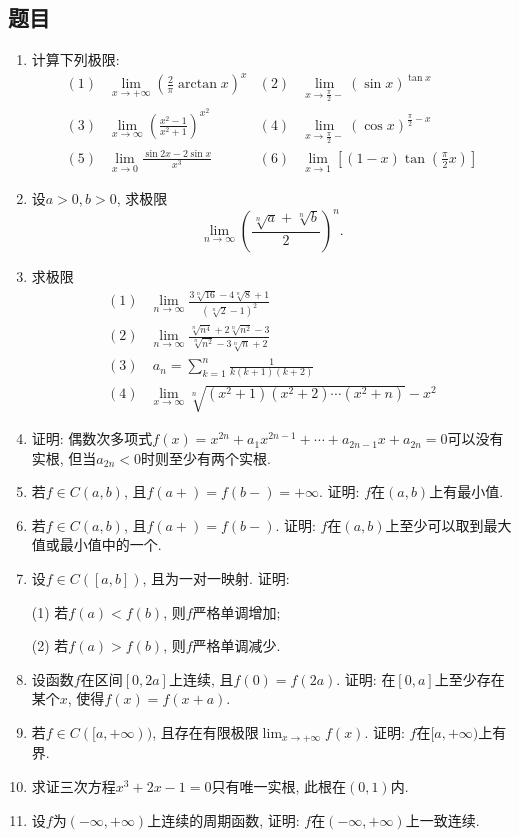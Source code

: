 \documentclass[UTF8,11pt, a4paper, oneside, fontset=none]{ctexbook}
\begin{document}
\subsection*{题目}
\begin{enumerate}

\item 计算下列极限:
\begin{align*}
(1) & \lim_{x \to +\infty} \left( \frac{2}{\pi} \arctan x\right)^x  & (2) & \lim_{x \to \frac{\pi}{2}-} (\sin x )^{\tan x}\\
(3) & \lim_{x \to \infty} \left( \frac{x^2 -1}{x^2 +1}\right)^{x^2} & (4) & \lim_{x \to \frac{\pi}{2}-} (\cos x)^{\frac{\pi}{2} - x} \\
(5) & \lim_{x \to 0} \frac{\sin 2x - 2 \sin x}{x^3} & (6) & \lim_{x \to 1} \left[(1-x)\tan\left(\frac{\pi}{2}x\right) \right]
\end{align*}

\item 设$a>0, b>0$, 求极限
\[
\lim_{n \to \infty} \left( \frac{\sqrt[n]{a} + \sqrt[n]{b}}{2} \right)^n.
\]

\item 求极限
\begin{align*}
(1) & \lim_{n \to \infty} \frac{3 \sqrt[n]{16} - 4 \sqrt[n]{8} +1}{(\sqrt[n]{2}-1)^2} \\
(2) & \lim_{n \to \infty}\frac{\sqrt[n]{n^4} + 2 \sqrt[n]{n^2} -3}{\sqrt[n]{n^2} - 3 \sqrt[n]{n} +2}\\
(3) & \ a_n = \sum_{k=1}^n \frac{1}{k(k+1)(k+2)}\\
(4) & \lim_{x \to \infty} \sqrt[n]{(x^2 + 1)(x^2 + 2) \cdots (x^2 + n)} - x^2
\end{align*}

\item 证明: 偶数次多项式$f(x) = x^{2n} + a_1 x^{2n-1} + \cdots + a_{2n-1} x + a_{2n} = 0$可以没有实根, 但当$a_{2n}<0$时则至少有两个实根.

\item 若$f \in C(a, b)$, 且$f(a+) = f(b-) = +\infty$. 证明: $f$在$(a, b)$上有最小值.

\item 若$f \in C(a, b)$, 且$f(a+) = f(b-)$. 证明: $f$在$(a, b)$上至少可以取到最大值或最小值中的一个.

\item 设$f \in C([a, b])$, 且为一对一映射. 证明:

(1) 若$f(a)<f(b)$, 则$f$严格单调增加;

(2) 若$f(a)>f(b)$, 则$f$严格单调减少.
\item 设函数$f$在区间$[0, 2a]$上连续, 且$f(0) = f(2a)$. 证明: 在$[0, a]$上至少存在某个$x$, 使得$f(x) = f(x+a)$.

\item 若$f \in C([a, +\infty))$, 且存在有限极限$\lim_{x \to +\infty}f(x)$. 证明: $f$在$[a, +\infty)$上有界.

\item 求证三次方程$x^3 + 2x -1=0$只有唯一实根, 此根在$(0, 1)$内.

\item 设$f$为$(-\infty, +\infty)$上连续的周期函数, 证明: $f$在$(-\infty, +\infty)$上一致连续.

\end{enumerate}
\end{document}
